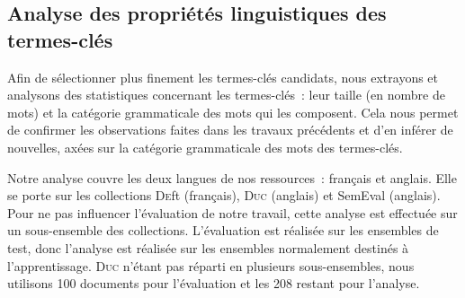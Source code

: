     \subsection{Analyse des propriétés linguistiques des termes-clés}
    \label{subsec:main:domain_independent_keyphrase_extraction-keyphrase_candidate_selection-analysis_of_keyphrase_properties}
      Afin de sélectionner plus finement les termes-clés candidats, nous
      extrayons et analysons des statistiques concernant les termes-clés~: leur
      taille (en nombre de mots) et la catégorie grammaticale des mots qui les
      composent. Cela nous permet de confirmer les observations faites dans les
      travaux précédents et d'en inférer de nouvelles, axées sur la catégorie
      grammaticale des mots des termes-clés.

      Notre analyse couvre les deux langues de nos ressources~: français et
      anglais. Elle se porte sur les collections \textsc{De}ft (français),
      \textsc{Duc} (anglais) et SemEval (anglais). Pour ne pas influencer
      l'évaluation de notre travail, cette analyse est effectuée sur un
      sous-ensemble des collections. L'évaluation est réalisée sur les ensembles
      de test, donc l'analyse est réalisée sur les ensembles normalement
      destinés à l'apprentissage. \textsc{Duc} n'étant pas réparti en plusieurs
      sous-ensembles, nous utilisons 100 documents pour l'évaluation et les 208
      restant pour l'analyse.

